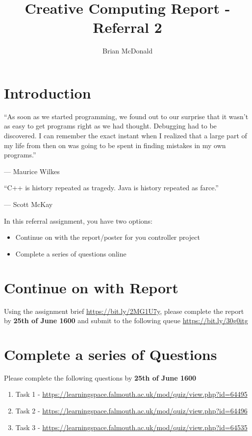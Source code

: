 \documentclass{../../../fal_assignment}
\title{Creative Computing Report - Referral 2}
\author{Brian McDonald}
\begin{document}
	
	\maketitle
	
	\section*{Introduction}
	
	\begin{marginquote}
		``As soon as we started programming, we found out to our surprise that it wasn't as easy to get programs right as we had thought. Debugging had to be discovered. I can remember the exact instant when I realized that a large part of my life from then on was going to be spent in finding mistakes in my own programs.''
		\par --- Maurice Wilkes
		\marginquoterule
		\par ``C++ is history repeated as tragedy. Java is history repeated as farce.''
		\par --- Scott McKay
	\end{marginquote}
	
	In this referral assignment, you have two options:
	
	\begin{itemize}
		\item Continue on with the report/poster for you controller project
		\item Complete a series of questions online 
	\end{itemize}

	\section*{Continue on with Report}
	
	Using the assignment brief \url{https://bit.ly/2MG1U7y}, please complete the report by \textbf{25th of June 1600} and submit to the following queue \url{https://bit.ly/30g0itg}
	
	\section*{Complete a series of Questions}
	
	Please complete the following questions by \textbf{25th of June 1600}
	
	\begin{enumerate}
		\item Task 1 - \href{https://learningspace.falmouth.ac.uk/mod/quiz/view.php?id=64495}{https://learningspace.falmouth.ac.uk/mod/quiz/view.php?id=64495}
		\item Task 2 - \href{https://learningspace.falmouth.ac.uk/mod/quiz/view.php?id=64496}{https://learningspace.falmouth.ac.uk/mod/quiz/view.php?id=64496}
		\item Task 3 - \href{https://learningspace.falmouth.ac.uk/mod/quiz/view.php?id=64535}{https://learningspace.falmouth.ac.uk/mod/quiz/view.php?id=64535}
	\end{enumerate}
	
\end{document}
